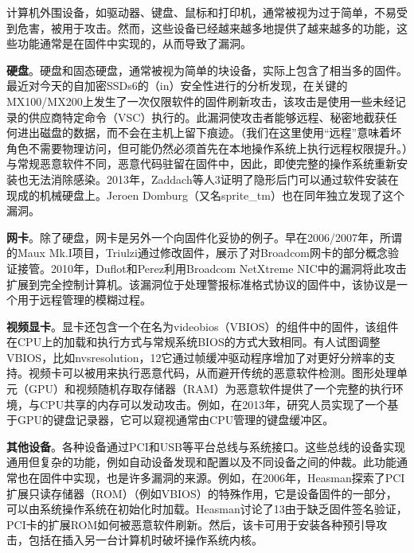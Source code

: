 计算机外围设备，如驱动器、键盘、鼠标和打印机，通常被视为过于简单，不易受到危害，被用于攻击。然而，这些设备已经越来越多地提供了越来越多的功能，这些功能通常是在固件中实现的，从而导致了漏洞。

\textbf{硬盘}。硬盘和固态硬盘，通常被视为简单的块设备，实际上包含了相当多的固件。最近对今天的自加密SSDs6的（in）安全性进行的分析发现，在关键的MX100/MX200上发生了一次仅限软件的固件刷新攻击，该攻击是使用一些未经记录的供应商特定命令（VSC）执行的。此漏洞使攻击者能够远程、秘密地截获任何进出磁盘的数据，而不会在主机上留下痕迹。（我们在这里使用“远程”意味着坏角色不需要物理访问，但可能仍然必须首先在本地操作系统上执行远程权限提升。）与常规恶意软件不同，恶意代码驻留在固件中，因此，即使完整的操作系统重新安装也无法消除感染。2013年，Zaddach等人3证明了隐形后门可以通过软件安装在现成的机械硬盘上。Jeroen Domburg（又名sprite\_tm）也在同年独立发现了这个漏洞。

\textbf{网卡}。除了硬盘，网卡是另外一个向固件化妥协的例子。早在2006/2007年，所谓的Maux Mk.I项目，Triulzi通过修改固件，展示了对Broadcom网卡的部分概念验证接管。2010年，Duflot和Perez利用Broadcom NetXtreme NIC中的漏洞将此攻击扩展到完全控制计算机。该漏洞位于处理警报标准格式协议的固件中，该协议是一个用于远程管理的模糊过程。

\textbf{视频显卡}。显卡还包含一个在名为videobios（VBIOS）的组件中的固件，该组件在CPU上的加载和执行方式与常规系统BIOS的方式大致相同。有人试图调整VBIOS，比如nvsresolution，12它通过帧缓冲驱动程序增加了对更好分辨率的支持。视频卡可以被用来执行恶意代码，从而避开传统的恶意软件检测。图形处理单元（GPU）和视频随机存取存储器（RAM）为恶意软件提供了一个完整的执行环境，与CPU共享的内存可以发动攻击。例如，在2013年，研究人员实现了一个基于GPU的键盘记录器，它可以窥视通常由CPU管理的键盘缓冲区。

\textbf{其他设备}。各种设备通过PCI和USB等平台总线与系统接口。这些总线的设备实现通用但复杂的功能，例如自动设备发现和配置以及不同设备之间的仲裁。此功能通常也在固件中实现，也是许多漏洞的来源。例如，在2006年，Heasman探索了PCI扩展只读存储器（ROM）（例如VBIOS）的特殊作用，它是设备固件的一部分，可以由系统操作系统在初始化时加载。Heasman讨论了13由于缺乏固件签名验证，PCI卡的扩展ROM如何被恶意软件刷新。然后，该卡可用于安装各种预引导攻击，包括在插入另一台计算机时破坏操作系统内核。


